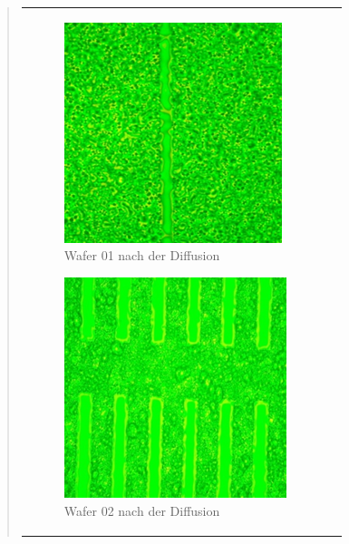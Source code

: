 \begin{quote}
\begin{center}
\begin{tabular}{ll}
                \hspace{-14em}
                    \begin{minipage}{0.8\textwidth}
                        \begin{figure}[H]
                        \hspace{8em}
                            \includegraphics[scale=1.2, trim = 0cm 0cm 0cm
                            0cm, clip]{./HerstellungBilder/MikroskopW1.png}
                            \caption{Wafer 01 nach der Diffusion}
                           \label{fig:diff01}
                        \end{figure}

                    \end{minipage}
                    \begin{minipage}{0.4\textwidth}

                        \begin{figure}[H]
                        \hspace{-2em}
                            \includegraphics[scale=1.2, trim = 0cm 0cm 0cm
                            0cm, clip]{./HerstellungBilder/MikroskopW2.png}
                            \caption{Wafer 02 nach der Diffusion}
                           \label{fig:diff02}
                        \end{figure}
                    \vspace{-1.5em}


\end{minipage}
\end{tabular}
\end{center}
\end{quote}
